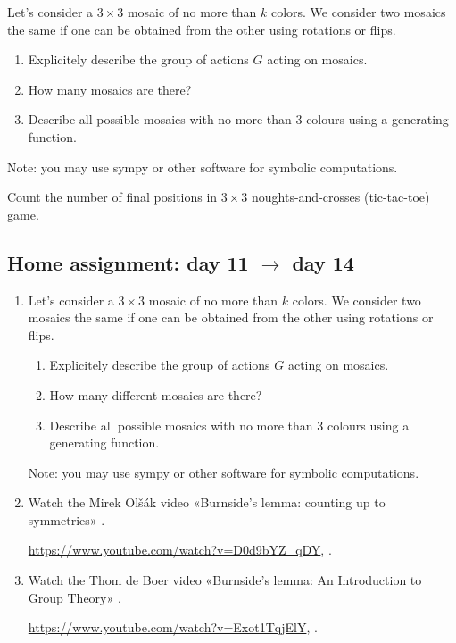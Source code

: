 \documentclass[12pt]{article}
\begin{document}
\begin{exercise}
    Let's consider a $3 \times 3$ mosaic of no more than $k$ colors. 
    We consider two mosaics the same if one can be obtained from the other using rotations or flips. 
    
        \begin{enumerate}[label=\alph*)]
        \item Explicitely describe the group of actions $G$ acting on mosaics. 
        \item How many mosaics are there?
        \item Describe all possible mosaics with no more than $3$ colours using a generating function.
    \end{enumerate}
    Note: you may use sympy or other software for symbolic computations.
\end{exercise}


\begin{exercise}
    Count the number of final positions in $3 \times 3$ noughts-and-crosses (tic-tac-toe) game.
\end{exercise}



\subsection*{Home assignment: day 11 $\to$ day 14}
\begin{enumerate}
    \item Let's consider a $3 \times 3$ mosaic of no more than $k$ colors. 
    We consider two mosaics the same if one can be obtained from the other using rotations or flips. 
    
        \begin{enumerate}[label=\alph*)]
        \item Explicitely describe the group of actions $G$ acting on mosaics. 
        \item How many different mosaics are there?
        \item Describe all possible mosaics with no more than $3$ colours using a generating function.
    \end{enumerate}
    Note: you may use sympy or other software for symbolic computations.

    \item Watch the Mirek Olšák video «Burnside's lemma: counting up to symmetries» \cite{olsak2020burnside}.

    \url{https://www.youtube.com/watch?v=D0d9bYZ_qDY},
    .

    \item Watch the Thom de Boer video «Burnside's lemma: An Introduction to Group Theory» \cite{boer2023burnside}.

    \url{https://www.youtube.com/watch?v=Exot1TqjElY},
    .


\end{enumerate}
\end{document}
